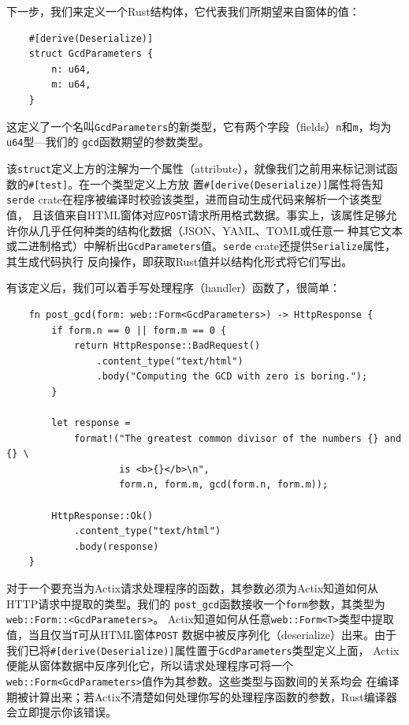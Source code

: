 \medskip
下一步，我们来定义一个Rust结构体，它代表我们所期望来自窗体的值：
\begin{verbatim}
    #[derive(Deserialize)]
    struct GcdParameters {
        n: u64,
        m: u64,
    }
\end{verbatim}

\smallskip
这定义了一个名叫\texttt{GcdParameters}的新类型，它有两个字段（fields）\texttt{n}和\texttt{m}，均为\texttt{u64}型---我们的
\texttt{gcd}函数期望的参数类型。

\medskip
该\texttt{struct}定义上方的注解为一个属性（attribute），就像我们之前用来标记测试函数的\texttt{\#[test]}。在一个类型定义上方放
置\texttt{\#[derive(Deserialize)]}属性将告知\texttt{serde} crate在程序被编译时校验该类型，进而自动生成代码来解析一个该类型值，
且该值来自HTML窗体对应\texttt{POST}请求所用格式数据。事实上，该属性足够允许你从几乎任何种类的结构化数据（JSON、YAML、TOML或任意一
种其它文本或二进制格式）中解析出\texttt{GcdParameters}值。\texttt{serde} crate还提供\texttt{Serialize}属性，其生成代码执行
反向操作，即获取Rust值并以结构化形式将它们写出。

\medskip
有该定义后，我们可以着手写处理程序（handler）函数了，很简单：
\begin{verbatim}
    fn post_gcd(form: web::Form<GcdParameters>) -> HttpResponse {
        if form.n == 0 || form.m == 0 {
            return HttpResponse::BadRequest()
                .content_type("text/html")
                .body("Computing the GCD with zero is boring.");
        }
        
        let response = 
            format!("The greatest common divisor of the numbers {} and {} \
                    is <b>{}</b>\n",
                    form.n, form.m, gcd(form.n, form.m));

        HttpResponse::Ok()
            .content_type("text/html")
            .body(response)
    }
\end{verbatim}

\smallskip
对于一个要充当为Actix请求处理程序的函数，其参数必须为Actix知道如何从HTTP请求中提取的类型。我们的
\texttt{post\_gcd}函数接收一个\texttt{form}参数，其类型为\texttt{web::Form::<GcdParameters>}。
Actix知道如何从任意\texttt{web::Form<T>}类型中提取值，当且仅当\texttt{T}可从HTML窗体\texttt{POST}
数据中被反序列化（deserialize）出来。由于我们已将\texttt{\#[derive(Deserialize)]}属性置于\texttt{GcdParameters}类型定义上面，
Actix便能从窗体数据中反序列化它，所以请求处理程序可将一个\texttt{web::Form<GcdParameters>}值作为其参数。这些类型与函数间的关系均会
在编译期被计算出来；若Actix不清楚如何处理你写的处理程序函数的参数，Rust编译器会立即提示你该错误。

